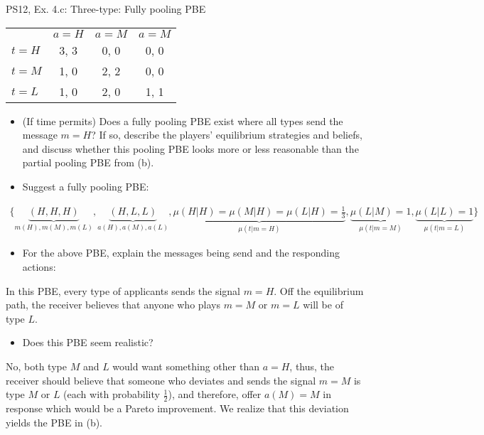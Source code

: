 \begin{frame}{PS12, Ex. 4.c: Three-type: Fully pooling PBE}
    \begin{table}
      \begin{tabular}{l|c|c|c|}
          \multicolumn{1}{c}{} & \multicolumn{1}{c}{$a=H$} & \multicolumn{1}{c}{$a=M$} & \multicolumn{1}{c}{$a=M$} \\\cline{2-4}
          $t=H$ & 3, 3 & 0, 0 & 0, 0 \\\cline{2-4}
          $t=M$ & 1, 0 & 2, 2 & 0, 0 \\\cline{2-4}
          $t=L$ & 1, 0 & 2, 0 & 1, 1 \\\cline{2-4}
      \end{tabular}
    \end{table}\vspace{-8pt}
    \begin{itemize}
      \item[(c)] (If time permits) Does a fully pooling PBE exist where all types send the message $m = H$? If so, describe the players’ equilibrium strategies and beliefs, and discuss whether this pooling PBE looks  more or less reasonable than the partial pooling PBE from (b).
      \item[Step 1:] Suggest a fully pooling PBE:
    \end{itemize}\vspace{-12pt}
    \begin{align*}
      \{\underbrace{(H,H,H)}_{m(H),m(M),m(L)},\underbrace{(H,L,L)}_{a(H),a(M),a(L)},\underbrace{\mu(H|H)=\mu(M|H)=\mu(L|H)=\frac{1}{3}}_{\mu(t|m=H)},\underbrace{\mu(L|M)=1}_{\mu(t|m=M)},\underbrace{\mu(L|L)=1}_{\mu(t|m=L)}\}
    \end{align*}\vspace{-14pt}
    \begin{itemize}
        \item[Step 2:] For the above PBE, explain the messages being send and the responding actions:
    \end{itemize}\vspace{-2pt}
    In this PBE, every type of applicants sends the signal $m=H$. Off the equilibrium path, the receiver believes that anyone who plays $m=M$ or $m=L$ will be of type $L$.\vspace{-2pt}
    \begin{itemize}
        \item[Step 3:] Does this PBE seem realistic?
    \end{itemize}\vspace{-2pt}
    No, both type $M$ and $L$ would want something other than $a=H$, thus, the receiver should believe that someone who deviates and sends the signal $m=M$ is type $M$ or $L$ (each with probability $\frac{1}{2}$), and therefore, offer $a(M)=M$ in response which would be a Pareto improvement. We realize that this deviation yields the PBE in (b).
    \vfill\null
\end{frame}
